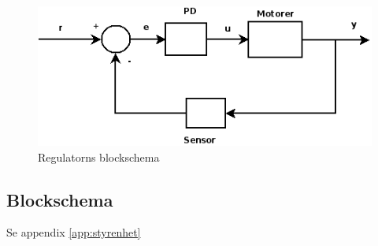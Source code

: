 \begin{figure}[h]
        \label{regulator}
        \begin{center}
                \includegraphics[scale=0.7]{bilder/regulator.png}
        \end{center}
        \caption{Regulatorns blockschema}
\end{figure}
\subsection{Blockschema}
Se appendix \ref{app:styrenhet}
